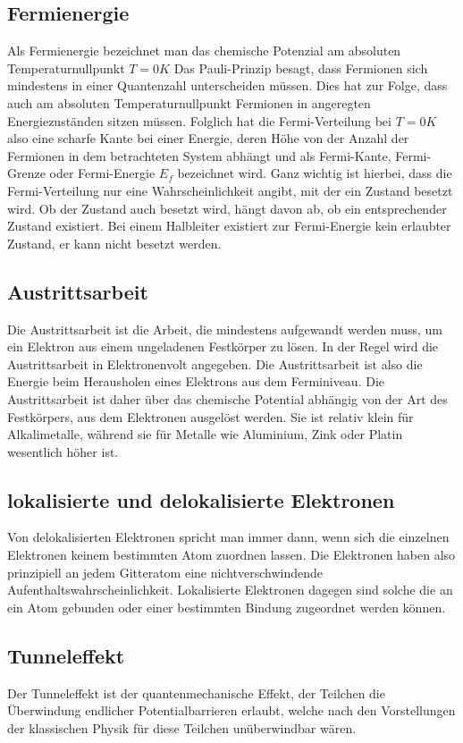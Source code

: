 \documentclass[12pt]{article}
\begin{document}
\subsection{Fermienergie}
Als Fermienergie bezeichnet man das chemische Potenzial am absoluten Temperaturnullpunkt $T = 0K$
Das Pauli-Prinzip besagt, dass Fermionen sich mindestens in einer Quantenzahl unterscheiden müssen. Dies hat zur Folge, dass auch am absoluten Temperaturnullpunkt Fermionen in angeregten Energiezuständen sitzen müssen. Folglich hat die Fermi-Verteilung bei $T = 0 K$ also eine scharfe Kante bei einer Energie, deren Höhe von der Anzahl der Fermionen in dem betrachteten System abhängt und als Fermi-Kante, Fermi-Grenze oder Fermi-Energie $E_f$ bezeichnet wird. Ganz wichtig ist hierbei, dass die Fermi-Verteilung nur eine Wahrscheinlichkeit angibt, mit der ein Zustand besetzt wird. Ob der Zustand auch besetzt wird, hängt davon ab, ob ein entsprechender Zustand existiert. Bei einem Halbleiter existiert zur Fermi-Energie kein erlaubter Zustand, er kann nicht besetzt werden.

\subsection{Austrittsarbeit}
Die Austrittsarbeit ist die Arbeit, die mindestens aufgewandt werden muss, um ein Elektron aus einem ungeladenen Festkörper zu lösen. In der Regel wird die Austrittsarbeit in Elektronenvolt angegeben. Die Austrittsarbeit ist also die Energie beim Herausholen eines Elektrons aus dem Ferminiveau. Die Austrittsarbeit ist daher über das chemische Potential abhängig von der Art des Festkörpers, aus dem Elektronen ausgelöst werden. Sie ist relativ klein für Alkalimetalle, während sie für Metalle wie Aluminium, Zink oder Platin wesentlich höher ist.

\subsection{lokalisierte und delokalisierte Elektronen}
Von delokalisierten Elektronen spricht man immer dann, wenn sich die einzelnen Elektronen keinem bestimmten Atom zuordnen lassen. Die Elektronen haben also prinzipiell an jedem Gitteratom eine nichtverschwindende Aufenthaltswahrscheinlichkeit.
Lokalisierte Elektronen dagegen sind solche die an ein Atom gebunden oder einer bestimmten Bindung zugeordnet werden können.

\subsection{Tunneleffekt}
Der Tunneleffekt ist der quantenmechanische Effekt, der Teilchen die Überwindung endlicher Potentialbarrieren erlaubt, welche nach den Vorstellungen der klassischen Physik für diese Teilchen unüberwindbar wären.
\end{document}
